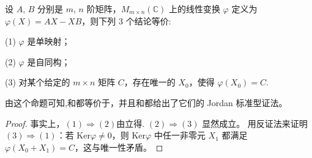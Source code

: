 \documentclass[../../main.tex]{subfiles}%
\begin{document}
\begin{proposition}\label{proposition:AX-XB线性映射相关等价条件}
设 $A$, $B$ 分别是 $m$, $n$ 阶矩阵，$M_{m\times n}(\mathbb{C})$ 上的线性变换 $\varphi$ 定义为 $\varphi(X) = AX - XB$，则下列 3 个结论等价:

(1) $\varphi$ 是单映射；

(2) $\varphi$ 是自同构；

(3) 对某个给定的 $m \times n$ 矩阵 $C$，存在唯一的 $X_0$，使得 $\varphi(X_0) = C$.
\end{proposition}
\begin{remark}
由这个命题可知,和都等价于，并且和都给出了它们的 Jordan 标准型证法。
\end{remark}
\begin{proof}

事实上，$(1) \Rightarrow (2)$由立得. 
$(2) \Rightarrow (3)$ 显然成立。
用反证法来证明 $(3) \Rightarrow (1)$：若 $\mathrm{Ker}\varphi \neq 0$，则 $\mathrm{Ker}\varphi$ 中任一非零元 $X_1$ 都满足 $\varphi(X_0 + X_1) = C$，这与唯一性矛盾。

\end{proof}
\end{document}
